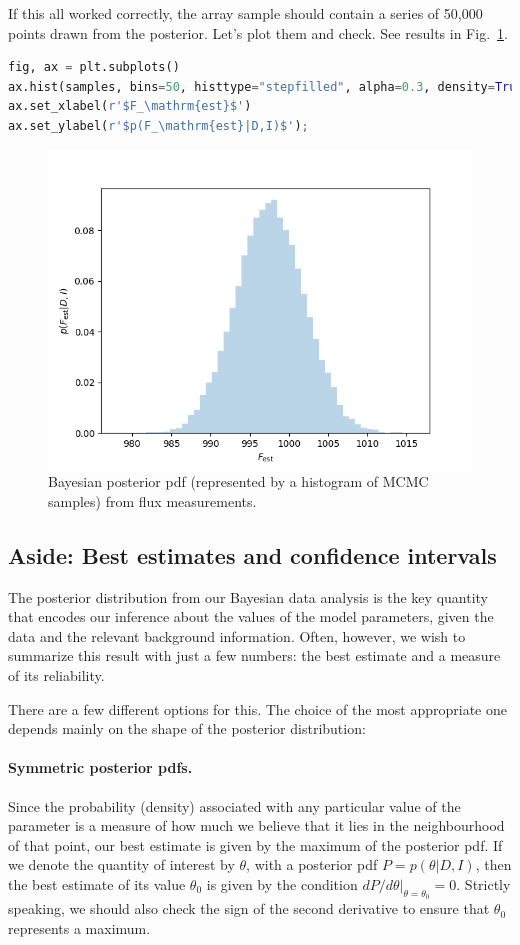 \documentclass[%
oneside,                 %
final,                   %
10pt]{article}
\begin{document}
If this all worked correctly, the array sample should contain a series of 50,000 points drawn from the posterior. Let's plot them and check. See results in Fig.~\ref{fig:flux-bayesian}.

\begin{lstlisting}[language=Python,style=blue1]
fig, ax = plt.subplots()
ax.hist(samples, bins=50, histtype="stepfilled", alpha=0.3, density=True)
ax.set_xlabel(r'$F_\mathrm{est}$')
ax.set_ylabel(r'$p(F_\mathrm{est}|D,I)$');
\end{lstlisting}

\begin{figure}[!ht]  %
  \centerline{\includegraphics[width=0.8\linewidth]{fig/singlephotoncount_fig_2.png}}
  \caption{
  Bayesian posterior pdf (represented by a histogram of MCMC samples) from flux measurements. \label{fig:flux-bayesian}
  }
\end{figure}


\subsection{Aside: Best estimates and confidence intervals}
The posterior distribution from our Bayesian data analysis is the key quantity that encodes our inference about the values of the model parameters, given the data and the relevant background information. Often, however, we wish to summarize this result with just a few numbers: the best estimate and a measure of its reliability. 

There are a few different options for this. The choice of the most appropriate one depends mainly on the shape of the posterior distribution:

\paragraph{Symmetric posterior pdfs.}
Since the probability (density) associated with any particular value of the parameter is a measure of how much we believe that it lies in the neighbourhood of that point, our best estimate is given by the maximum of the posterior pdf. If we denote the quantity of interest by $\theta$, with a posterior pdf $P =p(\theta|D,I)$, then the best estimate of its value $\theta_0$ is given by the condition $dP/d\theta|_{\theta=\theta_0}=0$. Strictly speaking, we should also check the sign of the second derivative to ensure that $\theta_0$ represents a maximum.
\end{document}
